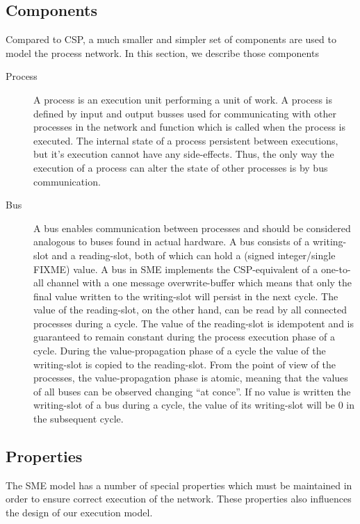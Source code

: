 \subsection{Components}
Compared to CSP, a much smaller and simpler set of components are used
to model the process network. In this section, we describe those
components

\begin{description}
\item[Process] A process is an execution unit performing a unit of
  work. A process is defined by input and output busses used for
  communicating with other processes in the network and function which
  is called when the process is executed. The internal state of a
  process persistent between executions, but it's execution cannot
  have any side-effects. Thus, the only way the execution of a process
  can alter the state of other processes is by bus
  communication. 
\item[Bus] A bus enables communication between processes and should be
  considered analogous to buses found in actual hardware. A bus
  consists of a writing-slot and a reading-slot, both of which can
  hold a (signed integer/single FIXME) value. A bus in SME implements the
  CSP-equivalent of a one-to-all channel with a one message
  overwrite-buffer which means that only the final value written to
  the writing-slot will persist in the next cycle. The value of the
  reading-slot, on the other hand, can be read by all connected
  processes during a cycle. The value of the reading-slot is
  idempotent and is guaranteed to remain constant during the process
  execution phase of a cycle. During the value-propagation phase of a
  cycle the value of the writing-slot is copied to the
  reading-slot. From the point of view of the processes, the
  value-propagation phase is atomic, meaning that the values of all
  buses can be observed changing ``at conce''. If no value is written
  the writing-slot of a bus during a cycle, the value of its
  writing-slot will be 0 in the subsequent cycle.

\end{description}

\subsection{Properties}
The SME model has a number of special properties which must be
maintained in order to ensure correct execution of the network. These
properties also influences the design of our execution model.

